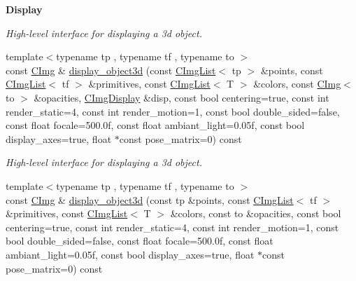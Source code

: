 \begin{Indent}{\bf Display}
\begin{DoxyCompactItemize}
\begin{DoxyCompactList}\small\item\em High-\/level interface for displaying a 3d object. \item\end{DoxyCompactList}\item 
\hypertarget{structcimg__library_1_1_c_img_af1bd7b30139cddfec8e137209cddb17f}{
{\footnotesize template$<$typename tp , typename tf , typename to $>$ }\\const \hyperlink{structcimg__library_1_1_c_img}{CImg} \& \hyperlink{structcimg__library_1_1_c_img_af1bd7b30139cddfec8e137209cddb17f}{display\_\-object3d} (const \hyperlink{structcimg__library_1_1_c_img_list}{CImgList}$<$ tp $>$ \&points, const \hyperlink{structcimg__library_1_1_c_img_list}{CImgList}$<$ tf $>$ \&primitives, const \hyperlink{structcimg__library_1_1_c_img_list}{CImgList}$<$ T $>$ \&colors, const \hyperlink{structcimg__library_1_1_c_img}{CImg}$<$ to $>$ \&opacities, \hyperlink{structcimg__library_1_1_c_img_display}{CImgDisplay} \&disp, const bool centering=true, const int render\_\-static=4, const int render\_\-motion=1, const bool double\_\-sided=false, const float focale=500.0f, const float ambiant\_\-light=0.05f, const bool display\_\-axes=true, float $\ast$const pose\_\-matrix=0) const }
\label{structcimg__library_1_1_c_img_af1bd7b30139cddfec8e137209cddb17f}

\begin{DoxyCompactList}\small\item\em High-\/level interface for displaying a 3d object. \item\end{DoxyCompactList}\item 
\hypertarget{structcimg__library_1_1_c_img_a32ad02f078b90d6ef64fb7cf684241a6}{
{\footnotesize template$<$typename tp , typename tf , typename to $>$ }\\const \hyperlink{structcimg__library_1_1_c_img}{CImg} \& \hyperlink{structcimg__library_1_1_c_img_a32ad02f078b90d6ef64fb7cf684241a6}{display\_\-object3d} (const tp \&points, const \hyperlink{structcimg__library_1_1_c_img_list}{CImgList}$<$ tf $>$ \&primitives, const \hyperlink{structcimg__library_1_1_c_img_list}{CImgList}$<$ T $>$ \&colors, const to \&opacities, const bool centering=true, const int render\_\-static=4, const int render\_\-motion=1, const bool double\_\-sided=false, const float focale=500.0f, const float ambiant\_\-light=0.05f, const bool display\_\-axes=true, float $\ast$const pose\_\-matrix=0) const }
\label{structcimg__library_1_1_c_img_a32ad02f078b90d6ef64fb7cf684241a6}


\end{DoxyCompactItemize}
\end{Indent}
